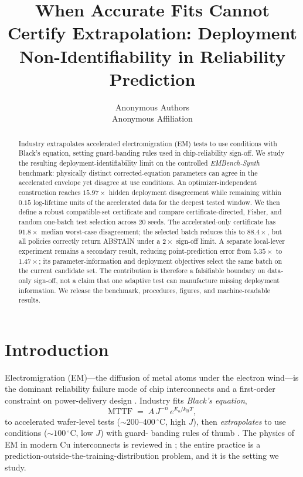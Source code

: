 \documentclass{article}
\title{When Accurate Fits Cannot Certify Extrapolation: Deployment Non-Identifiability in Reliability Prediction}
\author{%
  Anonymous Authors\\
  Anonymous Affiliation
}
\newcommand{\Ea}{E_{\mathrm{a}}}
\newcommand{\MTTF}{\mathrm{MTTF}}
\begin{document}
\nolinenumbers
\maketitle

\begin{abstract}
Industry extrapolates accelerated electromigration (EM) tests to use conditions
with Black's equation, setting guard-banding rules used in chip-reliability
sign-off. We study the resulting deployment-identifiability limit on the
controlled \emph{EMBench-Synth} benchmark: physically distinct corrected-equation
parameters can agree in the accelerated envelope yet disagree at use
conditions. An optimizer-independent construction reaches $15.97\times$ hidden
deployment disagreement while remaining within $0.15$ log-lifetime units of
the accelerated data for the deepest tested window. We then define a robust
compatible-set certificate and compare certificate-directed, Fisher, and random
one-batch test selection across 20 seeds. The accelerated-only certificate has
$91.8\times$ median worst-case disagreement; the selected batch reduces this
to $88.4\times$, but all policies correctly return ABSTAIN under a $2\times$
sign-off limit. A separate local-lever experiment remains a secondary result,
reducing point-prediction error from $5.35\times$ to $1.47\times$; its
parameter-information and deployment objectives select the same batch on the
current candidate set. The contribution is therefore a falsifiable boundary
on data-only sign-off, not a claim that one adaptive test can manufacture
missing deployment information. We release the benchmark, procedures, figures,
and machine-readable results.
\end{abstract}

\section{Introduction}

Electromigration (EM)---the diffusion of metal atoms under the electron
wind---is the dominant reliability failure mode of chip interconnects and a
first-order constraint on power-delivery design \citep{black69,hu_em}. Industry
fits \emph{Black's equation},
\begin{equation}
  \label{eq:black}
  \MTTF \;=\; A\, J^{-n}\, e^{\Ea/k_{\mathrm{B}}T},
\end{equation}
to accelerated wafer-level tests ($\sim200$--$400\,^\circ$C, high $J$), then
\emph{extrapolates} to use conditions ($\sim100\,^\circ$C, low $J$) with guard-
banding rules of thumb \citep{irs,jedec}. The physics of EM in modern Cu
interconnects is reviewed in \citet{tu03,hauriege04,ceric11}; the entire
practice is a prediction-outside-the-training-distribution problem, and it is
the setting we study.
\end{document}
